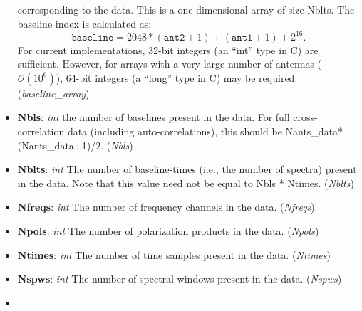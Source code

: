 \documentclass[11pt, oneside]{article}
\begin{document}
\begin{itemize}
  corresponding to the data. This is a one-dimensional array of size Nblts. The
  baseline index is calculated as:
  \[
    \mathtt{baseline} = 2048*(\mathtt{ant2}+1)+(\mathtt{ant1}+1) + 2^{16}.
  \]
  For current implementations, 32-bit integers (an ``int'' type in C) are
  sufficient. However, for arrays with a very large number of antennas
  ($\mathcal{O}(10^6)$), 64-bit integers (a ``long'' type in C) may be
  required. (\textit{baseline_array})
\item \textbf{Nbls}: \textit{int} the number of baselines present in the
  data. For full cross-correlation data (including auto-correlations), this
  should be Nants_data*(Nants_data+1)/2. (\textit{Nbls})
\item \textbf{Nblts}: \textit{int} The number of baseline-times (i.e., the
  number of spectra) present in the data. Note that this value need not be equal
  to Nbls * Ntimes. (\textit{Nblts})
\item \textbf{Nfreqs}: \textit{int} The number of frequency channels in the
  data. (\textit{Nfreqs})
\item \textbf{Npols}: \textit{int} The number of polarization products in the
  data. (\textit{Npols})
\item \textbf{Ntimes}: \textit{int} The number of time samples present in the
  data. (\textit{Ntimes})
\item \textbf{Nspws}: \textit{int} The number of spectral windows present in the
  data. (\textit{Nspws})
\item \textbf{}
\end{itemize}
\end{document}
